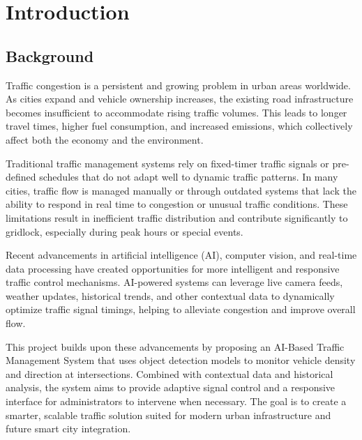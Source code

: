 \setlength{\parskip}{1em}    %
\setlength{\parindent}{0pt}  %
\chapter{Introduction}

\section{Background}

Traffic congestion is a persistent and growing problem in urban areas worldwide. As cities expand and vehicle ownership increases, the existing road infrastructure becomes insufficient to accommodate rising traffic volumes. This leads to longer travel times, higher fuel consumption, and increased emissions, which collectively affect both the economy and the environment.

Traditional traffic management systems rely on fixed-timer traffic signals or pre-defined schedules that do not adapt well to dynamic traffic patterns. In many cities, traffic flow is managed manually or through outdated systems that lack the ability to respond in real time to congestion or unusual traffic conditions. These limitations result in inefficient traffic distribution and contribute significantly to gridlock, especially during peak hours or special events.

Recent advancements in artificial intelligence (AI), computer vision, and real-time data processing have created opportunities for more intelligent and responsive traffic control mechanisms. AI-powered systems can leverage live camera feeds, weather updates, historical trends, and other contextual data to dynamically optimize traffic signal timings, helping to alleviate congestion and improve overall flow.

This project builds upon these advancements by proposing an AI-Based Traffic Management System that uses object detection models to monitor vehicle density and direction at intersections. Combined with contextual data and historical analysis, the system aims to provide adaptive signal control and a responsive interface for administrators to intervene when necessary. The goal is to create a smarter, scalable traffic solution suited for modern urban infrastructure and future smart city integration.

